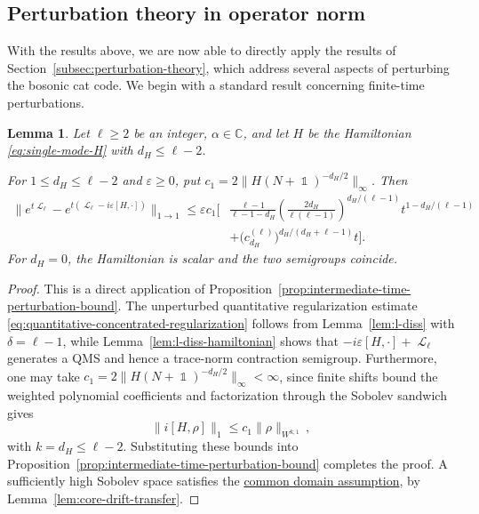 \documentclass[11pt]{article}
\theoremstyle{myplain}
\newtheorem{lem}[lem]{Lemma}
\theoremstyle{mydefinition}
\theoremstyle{remark}
\DeclareMathOperator{\cL}{\mathcal{L}}
\DeclareMathOperator{\1}{\mathds{1}}
\begin{document}
    \subsection{Perturbation theory in operator norm}\label{subsec:applicatio-perturbation-theory}
        With the results above, we are now able to directly apply the results of Section~\ref{subsec:perturbation-theory}, which address several aspects of perturbing the bosonic cat code. We begin with a standard result concerning finite-time perturbations.

        \begin{lem}\label{lem:application-finite-time-perturbation}
            Let $\ell \geq 2$ be an integer, $\alpha \in \mathbb{C}$, and let $H$ be the Hamiltonian \eqref{eq:single-mode-H} with $d_H \leq \ell - 2$.
            
            For $1\leq d_H\leq\ell-2$ and $\varepsilon\geq0$, put $c_1=2\|H(N+\1)^{-d_H/2}\|_\infty$. Then
            \begin{equation*}
                \begin{aligned}
                    \|e^{t\cL_\ell}-e^{t(\cL_\ell-i\varepsilon[H,\cdot])}\|_{1\to1}
                    \leq\varepsilon c_1\biggl[&\frac{\ell-1}{\ell-1-d_H}
                    \left(\frac{2d_H}{\ell(\ell-1)}\right)^{d_H/(\ell-1)}t^{1-d_H/(\ell-1)}\\
                    &+\bigl(c_{d_H}^{(\ell)}\bigr)^{d_H/(d_H+\ell-1)}t\biggr].
                \end{aligned}
            \end{equation*}
            For $d_H=0$, the Hamiltonian is scalar and the two semigroups coincide.
            
        \end{lem}
        \begin{proof}
            This is a direct application of Proposition~\ref{prop:intermediate-time-perturbation-bound}. The unperturbed quantitative regularization estimate \eqref{eq:quantitative-concentrated-regularization} follows from Lemma~\ref{lem:l-diss} with $\delta=\ell-1$, while Lemma~\ref{lem:l-diss-hamiltonian} shows that $-i\varepsilon[H,\cdot]+\cL_\ell$ generates a QMS and hence a trace-norm contraction semigroup. Furthermore, one may take $c_1=2\|H(N+\1)^{-d_H/2}\|_\infty<\infty$, since finite shifts bound the weighted polynomial coefficients and factorization through the Sobolev sandwich gives
            \begin{equation*}
                \|i[H,\rho]\|_1 \leq c_1 \|\rho\|_{W^{k,1}}\,,
            \end{equation*}
            with $k = d_H \leq \ell - 2$. Substituting these bounds into Proposition~\ref{prop:intermediate-time-perturbation-bound} completes the proof. A sufficiently high Sobolev space satisfies the \hyperref[assum:perturbation-common-domain]{common domain assumption}, by Lemma~\ref{lem:core-drift-transfer}.
        \end{proof}
\end{document}
